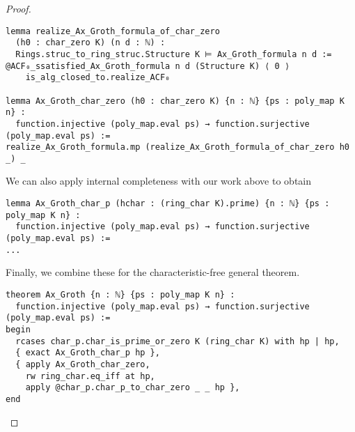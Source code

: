 \begin{proof}
\begin{lstlisting}
lemma realize_Ax_Groth_formula_of_char_zero
  (h0 : char_zero K) (n d : ℕ) :
  Rings.struc_to_ring_struc.Structure K ⊨ Ax_Groth_formula n d :=
@ACF₀_ssatisfied_Ax_Groth_formula n d (Structure K) ⟨ 0 ⟩
    is_alg_closed_to.realize_ACF₀

lemma Ax_Groth_char_zero (h0 : char_zero K) {n : ℕ} {ps : poly_map K n} :
  function.injective (poly_map.eval ps) → function.surjective (poly_map.eval ps) :=
realize_Ax_Groth_formula.mp (realize_Ax_Groth_formula_of_char_zero h0 _) _ \end{lstlisting}

We can also apply internal completeness with our work above to obtain

\begin{lstlisting}
lemma Ax_Groth_char_p (hchar : (ring_char K).prime) {n : ℕ} {ps : poly_map K n} :
  function.injective (poly_map.eval ps) → function.surjective (poly_map.eval ps) :=
... \end{lstlisting}

Finally, we combine these for the characteristic-free general theorem.

\begin{lstlisting}
theorem Ax_Groth {n : ℕ} {ps : poly_map K n} :
  function.injective (poly_map.eval ps) → function.surjective (poly_map.eval ps) :=
begin
  rcases char_p.char_is_prime_or_zero K (ring_char K) with hp | hp,
  { exact Ax_Groth_char_p hp },
  { apply Ax_Groth_char_zero,
    rw ring_char.eq_iff at hp,
    apply @char_p.char_p_to_char_zero _ _ hp },
end \end{lstlisting}
\end{proof}
